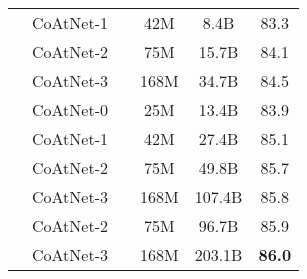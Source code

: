 \documentclass{article}
\newcommand{\name}{CoAtNet\xspace}
\begin{document}
\begin{table}[!ht]
\begin{tabular}{c l c c c c}
& \name-1 &  & 42M  & 8.4B & 83.3 \\
        & \name-2 &  & 75M  & 15.7B & 84.1 \\
        & \name-3 &  & 168M & 34.7B & 84.5 \\
        \cmidrule(lr){2-2} \cmidrule(lr){3-3} \cmidrule(lr){4-5} \cmidrule(l){6-6}
        & \name-0 &  & 25M  & 13.4B & 83.9 \\
& \name-1 &  & 42M  & 27.4B & 85.1 \\
        & \name-2 &  & 75M  & 49.8B & 85.7 \\
        & \name-3 &  & 168M & 107.4B & 85.8 \\
        & \name-2 &  & 75M  & 96.7B & 85.9 \\
        & \name-3 &  & 168M & 203.1B  & \bf 86.0 \\
        \bottomrule
    \end{tabular}
    \label{tab:i1k_result}
\end{table}
\end{document}
